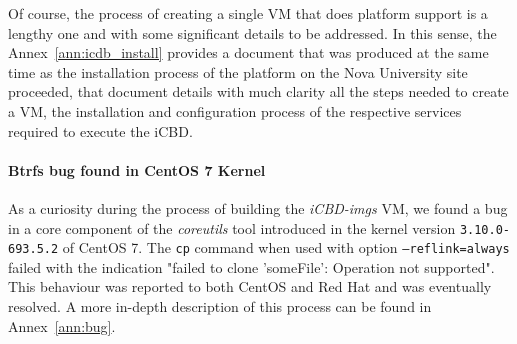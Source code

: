 Of course, the process of creating a single VM that does platform support is a lengthy one and with some significant details to be addressed. In this sense, the Annex~\ref{ann:icdb_install} provides a document that was produced at the same time as the installation process of the platform on the Nova University site proceeded, that document details with much clarity all the steps needed to create a VM, the installation and configuration process of the respective services required to execute the iCBD.

\paragraph{Btrfs bug found in CentOS 7 Kernel}
\label{par:impl_centos_bug}

As a curiosity during the process of building the \textit{iCBD-imgs} VM, we found a bug in a core component of the \textit{coreutils} tool introduced in the kernel version \texttt{3.10.0-693.5.2} of CentOS 7. The \texttt{cp} command when used with option \texttt{--reflink=always} failed with the indication "failed to clone 'someFile': Operation not supported". This behaviour was reported to both CentOS and Red Hat and was eventually resolved. A more in-depth description of this process can be found in Annex~\ref{ann:bug}.







